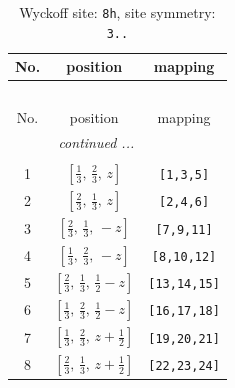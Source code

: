 \documentclass[fleqn,8pt]{jsarticle}
\begin{document}
\begin{longtable}{ccc}
\caption{Wyckoff site: {\tt 8h}, site symmetry: {\tt 3..}}
 \\
 \hline \hline
No. & position & mapping \\ \hline \endfirsthead

\multicolumn{2}{l}{\tablename\ \thetable{}} \\
 \hline \hline
No. & position & mapping \\ \hline \endhead

 \hline \hline
\multicolumn{2}{r}{\footnotesize\it continued ...} \\ \endfoot

 \hline \hline
\multicolumn{2}{r}{} \\ \endlastfoot

1 & $\left[ \frac{1}{3},\, \frac{2}{3},\, z \right]$ & {\tt [1,3,5]} \\ \hline
2 & $\left[ \frac{2}{3},\, \frac{1}{3},\, z \right]$ & {\tt [2,4,6]} \\ \hline
3 & $\left[ \frac{2}{3},\, \frac{1}{3},\, - z \right]$ & {\tt [7,9,11]} \\ \hline
4 & $\left[ \frac{1}{3},\, \frac{2}{3},\, - z \right]$ & {\tt [8,10,12]} \\ \hline
5 & $\left[ \frac{2}{3},\, \frac{1}{3},\, \frac{1}{2} - z \right]$ & {\tt [13,14,15]} \\ \hline
6 & $\left[ \frac{1}{3},\, \frac{2}{3},\, \frac{1}{2} - z \right]$ & {\tt [16,17,18]} \\ \hline
7 & $\left[ \frac{1}{3},\, \frac{2}{3},\, z + \frac{1}{2} \right]$ & {\tt [19,20,21]} \\ \hline
8 & $\left[ \frac{2}{3},\, \frac{1}{3},\, z + \frac{1}{2} \right]$ & {\tt [22,23,24]} \\
\end{longtable}
\renewcommand{\arraystretch}{1.2}
\end{document}

